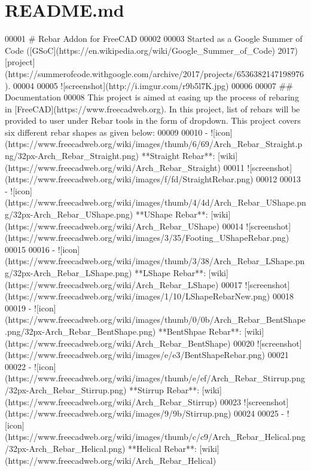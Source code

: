 \hypertarget{README_8md_source}{}\section{R\+E\+A\+D\+M\+E.\+md}

\begin{DoxyCode}
00001 # Rebar Addon for FreeCAD
00002 
00003 Started as a Google Summer of Code ([GSoC](https://en.wikipedia.org/wiki/Google\_Summer\_of\_Code) 2017)
       [project](https://summerofcode.withgoogle.com/archive/2017/projects/6536382147198976).
00004 
00005 ![screenshot](http://i.imgur.com/r9b5l7K.jpg)
00006 
00007 ## Documentation
00008 This project is aimed at easing up the process of rebaring in [FreeCAD](https://www.freecadweb.org).
       In this project, list of rebars will be provided to user under Rebar tools in the form of dropdown. This
       project covers six different rebar shapes as given below:
00009 
00010 -
       ![icon](https://www.freecadweb.org/wiki/images/thumb/6/69/Arch\_Rebar\_Straight.png/32px-Arch\_Rebar\_Straight.png) **Straight Rebar**: [wiki](https://www.freecadweb.org/wiki/Arch\_Rebar\_Straight)
00011 ![screenshot](https://www.freecadweb.org/wiki/images/f/fd/StraightRebar.png)
00012 
00013 -
       ![icon](https://www.freecadweb.org/wiki/images/thumb/4/4d/Arch\_Rebar\_UShape.png/32px-Arch\_Rebar\_UShape.png) **UShape Rebar**: [wiki](https://www.freecadweb.org/wiki/Arch\_Rebar\_UShape)
00014 ![screenshot](https://www.freecadweb.org/wiki/images/3/35/Footing\_UShapeRebar.png)
00015 
00016 -
       ![icon](https://www.freecadweb.org/wiki/images/thumb/3/38/Arch\_Rebar\_LShape.png/32px-Arch\_Rebar\_LShape.png) **LShape Rebar**: [wiki](https://www.freecadweb.org/wiki/Arch\_Rebar\_LShape)
00017 ![screenshot](https://www.freecadweb.org/wiki/images/1/10/LShapeRebarNew.png)
00018 
00019 -
       ![icon](https://www.freecadweb.org/wiki/images/thumb/0/0b/Arch\_Rebar\_BentShape.png/32px-Arch\_Rebar\_BentShape.png) **BentShpae Rebar**: [wiki](https://www.freecadweb.org/wiki/Arch\_Rebar\_BentShape)
00020 ![screenshot](https://www.freecadweb.org/wiki/images/e/e3/BentShapeRebar.png)
00021 
00022 -
       ![icon](https://www.freecadweb.org/wiki/images/thumb/e/ef/Arch\_Rebar\_Stirrup.png/32px-Arch\_Rebar\_Stirrup.png) **Stirrup Rebar**: [wiki](https://www.freecadweb.org/wiki/Arch\_Rebar\_Stirrup)
00023 ![screenshot](https://www.freecadweb.org/wiki/images/9/9b/Stirrup.png)
00024 
00025 -
       ![icon](https://www.freecadweb.org/wiki/images/thumb/c/c9/Arch\_Rebar\_Helical.png/32px-Arch\_Rebar\_Helical.png) **Helical Rebar**: [wiki](https://www.freecadweb.org/wiki/Arch\_Rebar\_Helical)

\end{DoxyCode}
